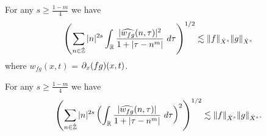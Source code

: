 %
%
\begin{proposition}
	\label{1prop:prim-bilin-est}
	For any $s \ge \frac{1-m}{4}$ we have
	\begin{equation}
		\label{1prim-bilin-est}
		\left( \sum_{n \in \dot{\mathbb{Z}}} |n|^{2s} \int_{\mathbb{R}}
		\frac{|\widehat{w_{fg}}(n, \tau) |^2}{1+ |\tau - 
		n^m| } 
		 \ d \tau 
		\right)^{1/2}
		\lesssim \|f\|_{\dot{X}^s} \|g\|_{\dot{X}^s}
	\end{equation}
	where $w_{fg}(x,t)$ = $\partial_x(fg)(x,t)$.
\end{proposition}
%
%
%
%
%
%
%
\begin{proposition}
\label{1prop:bilinear-estimate2}
For any $s \ge \frac{1-m}{4}$ we have
%
%
\begin{equation}
	\label{1bilinear-estimate2}
	\begin{split}
		\left( \sum_{n \in \dot{\mathbb{Z}}} |n|^{2s}  \left ( \int_{\mathbb{R}} 
		\frac{|\widehat{w_{fg}}(n, \tau) |}{1 + | \tau - n^m |}
		 \ d\tau \right)^2  \right)^{1/2} \lesssim \|f\|_{\dot{X}^s} \|g\|_{\dot{X}^s}.
	\end{split}
\end{equation}
\end{proposition}
%
%
%
%
%
